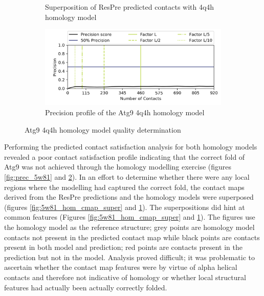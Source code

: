 \begin{figure}[htb]
\begin{subfigure}{0.45\textwidth}
  \caption{Superposition of ResPre predicted contacts with 4q4h homology model}
  \label{fig:4q4h_hom_cmap_super}
\end{subfigure}\hfil %
\begin{subfigure}{0.75\textwidth}
  \includegraphics[width=\linewidth]{Modelling of Atg9/prec_hmo_4q4h.png}
  \caption{Precision profile of the Atg9 4q4h homology model}
  \label{fig:prec_4q4h}
\end{subfigure}\hfil %
\caption{Atg9 4q4h homology model quality determination}
\small
\label{fig:atg9_4q4h_quality}
\end{figure}

Performing the predicted contact satisfaction analysis \cite{Simkovic2017} for both homology models revealed a poor contact satisfaction profile indicating that the correct fold of Atg9 was not achieved through the homology modelling exercise (figures \ref{fig:prec_5w81} and \ref{fig:prec_4q4h}).  In an effort to determine whether there were any local regions where the modelling had captured the correct fold, the contact maps derived from the ResPre \cite{yang2019genetic} predictions and the homology models were superposed (figures \ref{fig:5w81_hom_cmap_super} and \ref{fig:4q4h_hom_cmap_super}).  The superpositions did hint at common features (Figures \ref{fig:5w81_hom_cmap_super} and \ref{fig:4q4h_hom_cmap_super}).  The figures use the homology model as the reference structure; grey points are homology model contacts not present in the predicted contact map while black points are contacts present in both model and prediction; red points are contacts present in the prediction but not in the model. Analysis proved difficult; it was problematic to ascertain whether the contact map features were by virtue of alpha helical contacts and therefore not indicative of homology or whether local structural features had actually been actually correctly folded.

